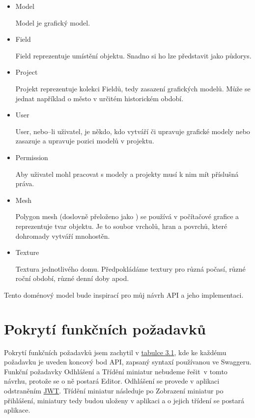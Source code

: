 \documentclass[thesis=B,czech]{FITthesis}[2012/06/26]
\begin{document}
        \begin{itemize}
            \item Model
            
            Model je grafický model.
            \item Field
            
            Field reprezentuje umístění objektu. Snadno si ho lze představit jako půdorys.
            \item Project
            
            Projekt reprezentuje kolekci Fieldů, tedy zasazení grafických modelů. Může se jednat například o město v určitém historickém období.
            \item User
            
            User, nebo--li uživatel, je někdo, kdo vytváří či upravuje grafické modely nebo zasazuje a upravuje pozici modelů v projektu.
            \item Permission
            
            Aby uživatel mohl pracovat s modely a projekty musí k nim mít příslušná práva.
            \item Mesh
            
            Polygon mesh (doslovně přeloženo jako ) se používá v počítačové grafice a reprezentuje tvar objektu. Je to soubor vrcholů, hran a povrchů, které dohromady vytváří mnohostěn.
            \item Texture
            
            Textura jednotlivého domu. Předpokládáme textury pro různá počasí, různé roční období, různé denní doby apod.
        \end{itemize}
        Tento doménový model bude inspirací pro můj návrh API a jeho implementaci.
    \section{Pokrytí funkčních požadavků}
        Pokrytí funkčních požadavků jsem zachytil v \hyperref[tab:tabulkaPokryti]{tabulce 3.1}, kde ke každému požadavku je uveden koncový bod API, zapsaný syntaxí používanou ve Swaggeru. Funkční požadavky Odhlášení a Třídění miniatur nebudeme řešit~v tomto návrhu, protože se o ně postará Editor.
        Odhlášení se provede v aplikaci odstraněním \hyperref[sec:jwt]{JWT}.
        Třídění miniatur následuje po Zobrazení miniatur po přihlášení, miniatury tedy budou uloženy v aplikaci a o jejich třídení se postará aplikace.
    
\end{document}
